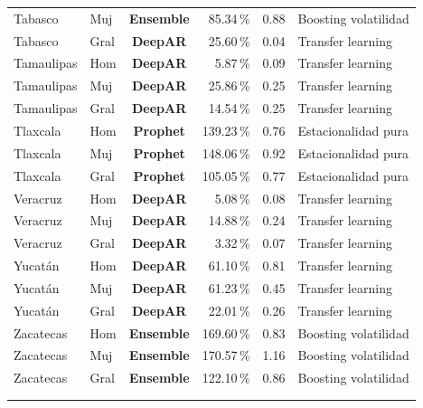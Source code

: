 \documentclass[12pt, letterpaper]{article}
\begin{document}
\begin{longtable}{l l >{\bfseries}c r r l}
Tabasco & Muj & \textcolor{censemble}{\textbf{Ensemble}} & 85.34\,\% & 0.88 & Boosting volatilidad \\
Tabasco & Gral & \textcolor{cdeepar}{\textbf{DeepAR}} & 25.60\,\% & 0.04 & Transfer learning \\
Tamaulipas & Hom & \textcolor{cdeepar}{\textbf{DeepAR}} & 5.87\,\% & 0.09 & Transfer learning \\
Tamaulipas & Muj & \textcolor{cdeepar}{\textbf{DeepAR}} & 25.86\,\% & 0.25 & Transfer learning \\
Tamaulipas & Gral & \textcolor{cdeepar}{\textbf{DeepAR}} & 14.54\,\% & 0.25 & Transfer learning \\
Tlaxcala & Hom & \textcolor{cprophet}{\textbf{Prophet}} & 139.23\,\% & 0.76 & Estacionalidad pura \\
Tlaxcala & Muj & \textcolor{cprophet}{\textbf{Prophet}} & 148.06\,\% & 0.92 & Estacionalidad pura \\
Tlaxcala & Gral & \textcolor{cprophet}{\textbf{Prophet}} & 105.05\,\% & 0.77 & Estacionalidad pura \\
Veracruz & Hom & \textcolor{cdeepar}{\textbf{DeepAR}} & 5.08\,\% & 0.08 & Transfer learning \\
Veracruz & Muj & \textcolor{cdeepar}{\textbf{DeepAR}} & 14.88\,\% & 0.24 & Transfer learning \\
Veracruz & Gral & \textcolor{cdeepar}{\textbf{DeepAR}} & 3.32\,\% & 0.07 & Transfer learning \\
Yucatán & Hom & \textcolor{cdeepar}{\textbf{DeepAR}} & 61.10\,\% & 0.81 & Transfer learning \\
Yucatán & Muj & \textcolor{cdeepar}{\textbf{DeepAR}} & 61.23\,\% & 0.45 & Transfer learning \\
Yucatán & Gral & \textcolor{cdeepar}{\textbf{DeepAR}} & 22.01\,\% & 0.26 & Transfer learning \\
Zacatecas & Hom & \textcolor{censemble}{\textbf{Ensemble}} & 169.60\,\% & 0.83 & Boosting volatilidad \\
Zacatecas & Muj & \textcolor{censemble}{\textbf{Ensemble}} & 170.57\,\% & 1.16 & Boosting volatilidad \\
Zacatecas & Gral & \textcolor{censemble}{\textbf{Ensemble}} & 122.10\,\% & 0.86 & Boosting volatilidad \\
\midrule
\rowcolor{cream!50} \multicolumn{6}{c}{\textbf{Alzheimer (G30)}} \\
\midrule
\rowcolor{lightgreen!15} \multicolumn{6}{l}{\textit{\small Nivel Nacional}} \\

\end{longtable}
\end{document}
